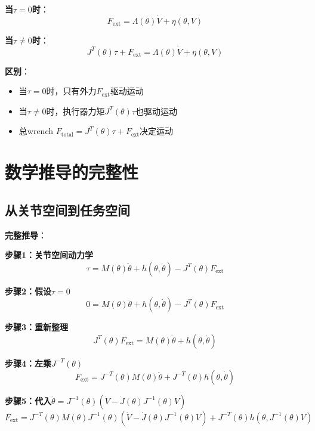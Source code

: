 \documentclass[12pt,a4paper]{article}
\begin{document}
\textbf{当$\tau = 0$时}：
\begin{equation}
F_{\text{ext}} = \Lambda(\theta)\dot{V} + \eta(\theta, V)
\end{equation}

\textbf{当$\tau \neq 0$时}：
\begin{equation}
J^T(\theta)\tau + F_{\text{ext}} = \Lambda(\theta)\dot{V} + \eta(\theta, V)
\end{equation}

\textbf{区别}：
\begin{itemize}
\item 当$\tau = 0$时，只有外力$F_{\text{ext}}$驱动运动
\item 当$\tau \neq 0$时，执行器力矩$J^T(\theta)\tau$也驱动运动
\item 总wrench $F_{\text{total}} = J^T(\theta)\tau + F_{\text{ext}}$决定运动
\end{itemize}

\section{数学推导的完整性}

\subsection{从关节空间到任务空间}

\textbf{完整推导}：

\textbf{步骤1：关节空间动力学}
\begin{equation}
\tau = M(\theta)\ddot{\theta} + h(\theta, \dot{\theta}) - J^T(\theta)F_{\text{ext}}
\end{equation}

\textbf{步骤2：假设$\tau = 0$}
\begin{equation}
0 = M(\theta)\ddot{\theta} + h(\theta, \dot{\theta}) - J^T(\theta)F_{\text{ext}}
\end{equation}

\textbf{步骤3：重新整理}
\begin{equation}
J^T(\theta)F_{\text{ext}} = M(\theta)\ddot{\theta} + h(\theta, \dot{\theta})
\end{equation}

\textbf{步骤4：左乘$J^{-T}(\theta)$}
\begin{equation}
F_{\text{ext}} = J^{-T}(\theta)M(\theta)\ddot{\theta} + J^{-T}(\theta)h(\theta, \dot{\theta})
\end{equation}

\textbf{步骤5：代入$\ddot{\theta} = J^{-1}(\theta)(\dot{V} - \dot{J}(\theta)J^{-1}(\theta)V)$}
\begin{equation}
F_{\text{ext}} = J^{-T}(\theta)M(\theta)J^{-1}(\theta)(\dot{V} - \dot{J}(\theta)J^{-1}(\theta)V) + J^{-T}(\theta)h(\theta, J^{-1}(\theta)V)
\end{equation}
\end{document}
